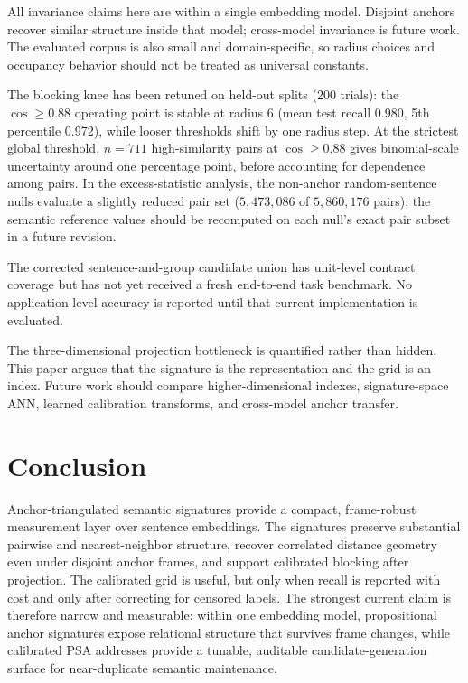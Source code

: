 \documentclass[11pt]{article}
\begin{document}
All invariance claims here are within a single embedding model. Disjoint anchors recover similar structure inside that model; cross-model invariance is future work. The evaluated corpus is also small and domain-specific, so radius choices and occupancy behavior should not be treated as universal constants.

The blocking knee has been retuned on held-out splits (200 trials): the $\cos\geq0.88$ operating point is stable at radius 6 (mean test recall 0.980, 5th percentile 0.972), while looser thresholds shift by one radius step. At the strictest global threshold, $n=711$ high-similarity pairs at $\cos\geq0.88$ gives binomial-scale uncertainty around one percentage point, before accounting for dependence among pairs. In the excess-statistic analysis, the non-anchor random-sentence nulls evaluate a slightly reduced pair set ($5{,}473{,}086$ of $5{,}860{,}176$ pairs); the semantic reference values should be recomputed on each null's exact pair subset in a future revision.

The corrected sentence-and-group candidate union has unit-level contract coverage but has not yet received a fresh end-to-end task benchmark. No application-level accuracy is reported until that current implementation is evaluated.

The three-dimensional projection bottleneck is quantified rather than hidden. This paper argues that the signature is the representation and the grid is an index. Future work should compare higher-dimensional indexes, signature-space ANN, learned calibration transforms, and cross-model anchor transfer.

\section{Conclusion}

Anchor-triangulated semantic signatures provide a compact, frame-robust measurement layer over sentence embeddings. The signatures preserve substantial pairwise and nearest-neighbor structure, recover correlated distance geometry even under disjoint anchor frames, and support calibrated blocking after projection. The calibrated grid is useful, but only when recall is reported with cost and only after correcting for censored labels. The strongest current claim is therefore narrow and measurable: within one embedding model, propositional anchor signatures expose relational structure that survives frame changes, while calibrated PSA addresses provide a tunable, auditable candidate-generation surface for near-duplicate semantic maintenance.
\end{document}
